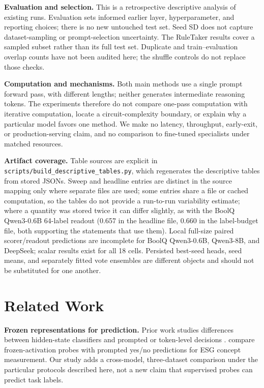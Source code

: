 \textbf{Evaluation and selection.} This is a retrospective descriptive
analysis of existing runs. Evaluation sets informed earlier layer,
hyperparameter, and reporting choices; there is no new untouched test set.
Seed SD does not capture dataset-sampling or prompt-selection uncertainty.
The RuleTaker results cover a sampled subset rather than its full test set.
Duplicate and train--evaluation overlap counts have not been audited here;
the shuffle controls do not replace those checks.

\textbf{Computation and mechanisms.} Both main methods use a single prompt
forward pass, with different lengths; neither generates intermediate
reasoning tokens. The experiments therefore do not compare one-pass
computation with iterative computation, locate a circuit-complexity
boundary, or explain why a particular model favors one method. We make no
latency, throughput, early-exit, or production-serving claim, and no
comparison to fine-tuned specialists under matched resources.

\textbf{Artifact coverage.} Table sources are explicit in
\texttt{scripts/build\_descriptive\_tables.py}, which regenerates the
descriptive tables from stored JSONs. Sweep and headline entries are
distinct in the source mapping only where separate files are used; some
entries share a file or cached computation, so the tables do not provide a
run-to-run variability estimate; where a quantity was stored twice it can
differ slightly, as with the BoolQ Qwen3-0.6B 64-label readout (0.657 in the
headline file, 0.660 in the label-budget file, both supporting the statements
that use them). Local
full-size paired scorer/readout predictions are incomplete for BoolQ
Qwen3-0.6B, Qwen3-8B, and DeepSeek; scalar results exist for all 18 cells.
Persisted best-seed heads, seed means, and separately fitted vote ensembles
are different objects and should not be substituted for one another.

\section{Related Work}
\label{sec:related}

\textbf{Frozen representations for prediction.} Prior work studies
differences between hidden-state classifiers and prompted or token-level
decisions \citep{cho2025hidden,buckmann2024logistic,cho2023palp}.
\citet{hazenoot2026esg} compare frozen-activation probes with prompted
yes/no predictions for ESG concept measurement. Our study adds a
cross-model, three-dataset comparison under the particular protocols
described here, not a new claim that supervised probes can predict task
labels.

